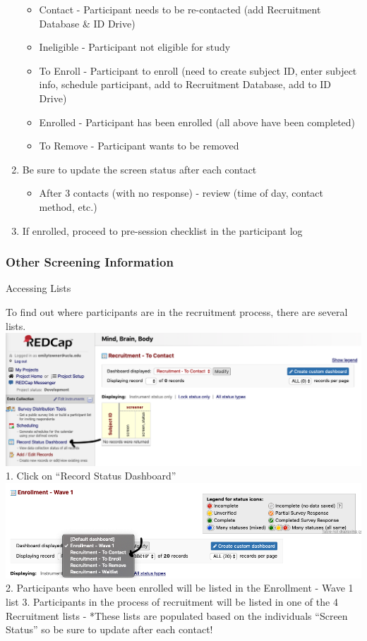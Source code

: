 \documentclass[]{book}
\providecommand{\tightlist}{%
  \setlength{\itemsep}{0pt}\setlength{\parskip}{0pt}}
\begin{document}
\begin{enumerate}
  \begin{itemize}
  \tightlist
  \item
    Contact - Participant needs to be re-contacted (add Recruitment Database \& ID Drive)
  \item
    Ineligible - Participant not eligible for study
  \item
    To Enroll - Participant to enroll (need to create subject ID, enter subject info, schedule participant, add to Recruitment Database, add to ID Drive)
  \item
    Enrolled - Participant has been enrolled (all above have been completed)
  \item
    To Remove - Participant wants to be removed
  \end{itemize}
\item
  Be sure to update the screen status after each contact

  \begin{itemize}
  \tightlist
  \item
    After 3 contacts (with no response) - review (time of day, contact method, etc.)
  \end{itemize}
\item
  If enrolled, proceed to pre-session checklist in the participant log
\end{enumerate}

\hypertarget{other-screening-information}{%
\subsubsection{Other Screening Information}\label{other-screening-information}}

Accessing Lists

To find out where participants are in the recruitment process, there are several lists.
\includegraphics{images/redcap_screening/7.png}
1. Click on ``Record Status Dashboard''
\includegraphics{images/redcap_screening/8.png}
2. Participants who have been enrolled will be listed in the Enrollment - Wave 1 list
3. Participants in the process of recruitment will be listed in one of the 4 Recruitment lists
- *These lists are populated based on the individuals ``Screen Status'' so be sure to update after each contact!
\end{document}
